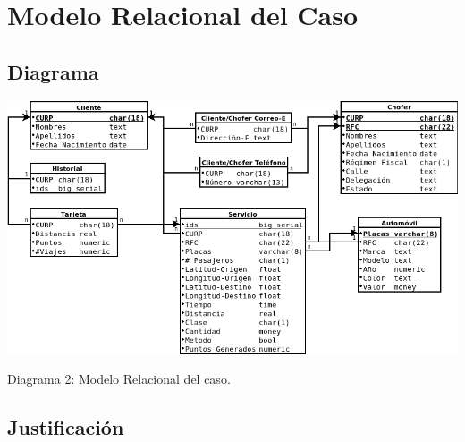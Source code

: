 \documentclass{article}
\begin{document}
       
       
       \section{Modelo Relacional del Caso}
       
       \subsection{Diagrama}
       
       \includegraphics[width=15cm]{R.png}\\
       \centerline{Diagrama 2: Modelo Relacional del caso.}
       
       \subsection{Justificación}
       
\end{document}
